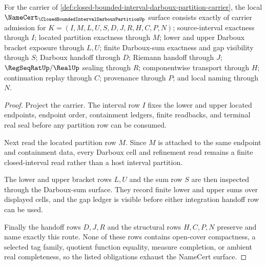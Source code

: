 \begin{theorem}
\label{thm:closed-bounded-interval-darboux-partition-namecert-obligations}
For the carrier of \autoref{def:closed-bounded-interval-darboux-partition-carrier}, the local $\NameCert_{\ClosedBoundedIntervalDarbouxPartitionUp}$ surface consists exactly of carrier admission for $K=(I,M,L,U,S,D,J,R,H,C,P,N)$; source-interval exactness through $I$; located partition exactness through $M$; lower and upper Darboux bracket exposure through $L,U$; finite Darboux-sum exactness and gap visibility through $S$; Darboux handoff through $D$; Riemann handoff through $J$; $\RegSeqRatUp/\RealUp$ sealing through $R$; componentwise transport through $H$; continuation replay through $C$; provenance through $P$; and local naming through $N$.
\end{theorem}
\begin{proof}
Project the carrier. The interval row $I$ fixes the lower and upper located endpoints, endpoint order, containment ledgers, finite readbacks, and terminal real seal before any partition row can be consumed.

Next read the located partition row $M$. Since $M$ is attached to the same endpoint and containment data, every Darboux cell and refinement read remains a finite closed-interval read rather than a host interval partition.

The lower and upper bracket rows $L,U$ and the sum row $S$ are then inspected through the Darboux-sum surface. They record finite lower and upper sums over displayed cells, and the gap ledger is visible before either integration handoff row can be used.

Finally the handoff rows $D,J,R$ and the structural rows $H,C,P,N$ preserve and name exactly this route. None of these rows contains open-cover compactness, a selected tag family, quotient function equality, measure completion, or ambient real completeness, so the listed obligations exhaust the NameCert surface.
\end{proof}

